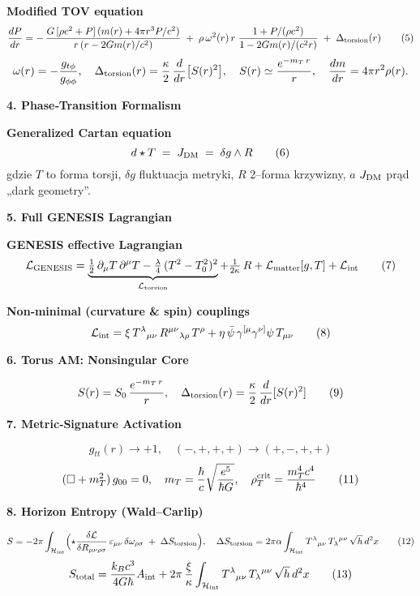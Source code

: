 \medskip
\noindent\textbf{Modified TOV equation}
\[
  \frac{dP}{dr}
  = -\,\frac{G\,[\rho c^2 + P]\,(m(r) + 4\pi r^3P/c^2)}
         {r\,(r-2Gm(r)/c^2)}
    \;+\;\rho\,\omega^2(r)\,r\;
      \frac{1 + P/(\rho c^2)}{1 - 2Gm(r)/(c^2r)}
    \;+\;\Delta_{\rm torsion}(r)
  \tag{5}
\]
\[
  \omega(r) = -\frac{g_{t\phi}}{g_{\phi\phi}}, 
  \quad
  \Delta_{\rm torsion}(r)
    = \frac\kappa2\,\frac{d}{dr}\bigl[S(r)^2\bigr],
  \quad
  S(r)\simeq \frac{e^{-m_T\,r}}r,
  \quad
  \frac{dm}{dr} = 4\pi r^2\rho(r).
\]

\bigskip
\noindent\textbf{4. Phase‐Transition Formalism}

\medskip
\noindent\textbf{Generalized Cartan equation} 
\[
  d\star T \;=\; J_{\rm DM} \;=\; \delta g\wedge R
  \tag{6}
\]
gdzie $T$ to forma torsji, $\delta g$ fluktuacja metryki, $R$ 2–forma krzywizny,
$a$ $J_{\rm DM}$ prąd „dark geometry”.

\bigskip
\noindent\textbf{5. Full GENESIS Lagrangian}

\medskip
\noindent\textbf{GENESIS effective Lagrangian}
\[
  \mathcal{L}_{\rm GENESIS}
  = \underbrace{\tfrac12\,\partial_\mu T\,\partial^\mu T
    -\tfrac\lambda4\,(T^2-T_0^2)^2}_{\mathcal{L}_{\rm torsion}}
  + \tfrac1{2\kappa}\,R
  + \mathcal{L}_{\rm matter}[g,T]
  + \mathcal{L}_{\rm int}
  \tag{7}
\]

\medskip
\noindent\textbf{Non‐minimal (curvature \& spin) couplings}
\[
  \mathcal{L}_{\rm int}
  = \xi\,T^\lambda{}_{\mu\nu}\,R^{\mu\nu}{}_{\lambda\rho}\,T^\rho
    + \eta\,\bar\psi\,\gamma^{[\mu}\gamma^{\nu]}\psi\,T_{\mu\nu}
  \tag{8}
\]

\bigskip
\noindent\textbf{6. Torus AM: Nonsingular Core}

\medskip
\[
  S(r) = S_0\,\frac{e^{-m_T\,r}}r,
  \quad
  \Delta_{\rm torsion}(r)
   = \frac\kappa2\,\frac{d}{dr}[S(r)^2]
   \tag{9}
\]

\bigskip
\noindent\textbf{7. Metric‐Signature Activation}

\medskip
\[
  g_{tt}(r)\longrightarrow+1,
  \quad
  (-,+,+,+)\longrightarrow(+,-,+,+)
  \tag{10}
\]
\[
  (\Box + m_T^2)\,g_{00}=0,
  \quad
  m_T = \frac\hbar c\sqrt{\frac{e^5}{\hbar G}},
  \quad
  \rho_T^{\rm crit} = \frac{m_T^4c^4}{\hbar^4}
  \tag{11}
\]

\bigskip
\noindent\textbf{8. Horizon Entropy (Wald–Carlip)}

\medskip
\[
  S = -2\pi
        \int_{\mathcal H_{\rm int}}
          \Bigl(\star\frac{\delta\mathcal L}{\delta R_{\mu\nu\rho\sigma}}
               \,\varepsilon_{\mu\nu}\,\delta\omega_{\rho\sigma}
               \;+\;\Delta S_{\rm torsion}\Bigr),
  \quad
  \Delta S_{\rm torsion}
   = 2\pi\alpha
     \int_{\mathcal H_{\rm int}}
       T^\lambda{}_{\mu\nu}\,T_\lambda{}^{\mu\nu}\,\sqrt h\,d^2x
  \tag{12}
\]
\[
  S_{\rm total}
   = \frac{k_Bc^3}{4G\hbar}A_{\rm int}
     + 2\pi\,\frac\xi\kappa
       \int_{\mathcal H_{\rm int}}
         T^\lambda{}_{\mu\nu}\,T_\lambda{}^{\mu\nu}\,\sqrt h\,d^2x
  \tag{13}
\]

